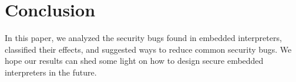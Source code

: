 \section{Conclusion}

In this paper, we analyzed the security bugs found in embedded interpreters,
classified their effects, and suggested ways to reduce common security bugs.
We hope our results can shed some light on
how to design secure embedded interpreters in the future.
